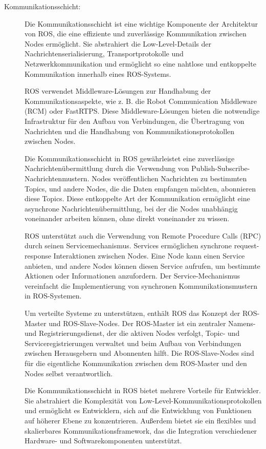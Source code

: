 \begin{description}
    
    \item[Kommunikationsschicht:] Die Kommunikationsschicht ist eine wichtige Komponente der Architektur von \ac{ROS}, die eine effiziente und zuverlässige Kommunikation zwischen Nodes ermöglicht. Sie abstrahiert die Low-Level-Details der Nachrichtenserialisierung, Transportprotokolle und Netzwerkkommunikation und ermöglicht so eine nahtlose und entkoppelte Kommunikation innerhalb eines \ac{ROS}-Systems.

    \ac{ROS} verwendet Middleware-Lösungen zur Handhabung der Kommunikationsaspekte, wie z. B. die Robot Communication Middleware (RCM) oder FastRTPS. Diese Middleware-Lösungen bieten die notwendige Infrastruktur für den Aufbau von Verbindungen, die Übertragung von Nachrichten und die Handhabung von Kommunikationsprotokollen zwischen Nodes.
    
    Die Kommunikationsschicht in \ac{ROS} gewährleistet eine zuverlässige Nachrichtenübermittlung durch die Verwendung von Publish-Subscribe-Nachrichtenmustern. Nodes veröffentlichen Nachrichten zu bestimmten Topics, und andere Nodes, die die Daten empfangen möchten, abonnieren diese Topics. Diese entkoppelte Art der Kommunikation ermöglicht eine asynchrone Nachrichtenübermittlung, bei der die Nodes unabhängig voneinander arbeiten können, ohne direkt voneinander zu wissen.
    
    \ac{ROS} unterstützt auch die Verwendung von Remote Procedure Calls (RPC) durch seinen Servicemechanismus. Services ermöglichen synchrone request-response Interaktionen zwischen Nodes. Eine Node kann einen Service anbieten, und andere Nodes können diesen Service aufrufen, um bestimmte Aktionen oder Informationen anzufordern. Der Service-Mechanismus vereinfacht die Implementierung von synchronen Kommunikationsmustern in \ac{ROS}-Systemen.
    
    Um verteilte Systeme zu unterstützen, enthält \ac{ROS} das Konzept der ROS-Master und ROS-Slave-Nodes. Der ROS-Master ist ein zentraler Namens- und Registrierungsdienst, der die aktiven Nodes verfolgt, Topic- und Serviceregistrierungen verwaltet und beim Aufbau von Verbindungen zwischen Herausgebern und Abonnenten hilft. Die ROS-Slave-Nodes sind für die eigentliche Kommunikation zwischen dem ROS-Master und den Nodes selbst verantwortlich.

    Die Kommunikationsschicht in \ac{ROS} bietet mehrere Vorteile für Entwickler. Sie abstrahiert die Komplexität von Low-Level-Kommunikationsprotokollen und ermöglicht es Entwicklern, sich auf die Entwicklung von Funktionen auf höherer Ebene zu konzentrieren. Außerdem bietet sie ein flexibles und skalierbares Kommunikationsframework, das die Integration verschiedener Hardware- und Softwarekomponenten unterstützt.
   

\end{description}

